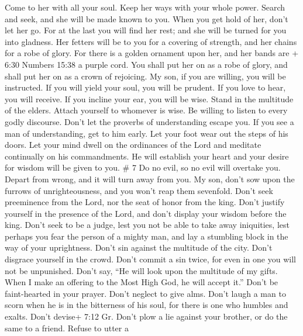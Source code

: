  Come to her with all your soul. Keep her ways with your
whole power.  Search and seek, and she will be made known
to you. When you get hold of her, don't let her go.  For at
the last you will find her rest; and she will be turned for you into
gladness.  Her fetters will be to you for a covering of
strength, and her chains for a robe of glory.  For there is
a golden ornament upon her, and her bands are + 6:30 Numbers 15:38 a
purple cord.  You shall put her on as a robe of glory, and
shall put her on as a crown of rejoicing.  My son, if you
are willing, you will be instructed. If you will yield your soul, you
will be prudent.  If you love to hear, you will receive. If
you incline your ear, you will be wise.  Stand in the
multitude of the elders. Attach yourself to whomever is wise.
 Be willing to listen to every godly discourse. Don't let
the proverbs of understanding escape you.  If you see a man
of understanding, get to him early. Let your foot wear out the steps of
his doors.  Let your mind dwell on the ordinances of the
Lord and meditate continually on his commandments. He will establish
your heart and your desire for wisdom will be given to you. \# 7
 Do no evil, so no evil will overtake you. 
Depart from wrong, and it will turn away from you.  My son,
don't sow upon the furrows of unrighteousness, and you won't reap them
sevenfold.  Don't seek preeminence from the Lord, nor the
seat of honor from the king.  Don't justify yourself in the
presence of the Lord, and don't display your wisdom before the king.
 Don't seek to be a judge, lest you not be able to take away
iniquities, lest perhaps you fear the person of a mighty man, and lay a
stumbling block in the way of your uprightness.  Don't sin
against the multitude of the city. Don't disgrace yourself in the crowd.
 Don't commit a sin twice, for even in one you will not be
unpunished.  Don't say, ``He will look upon the multitude of
my gifts. When I make an offering to the Most High God, he will accept
it.''  Don't be faint-hearted in your prayer. Don't neglect
to give alms.  Don't laugh a man to scorn when he is in the
bitterness of his soul, for there is one who humbles and exalts.
 Don't devise+ 7:12 Gr. Don't plow a lie against your
brother, or do the same to a friend.  Refuse to utter a
